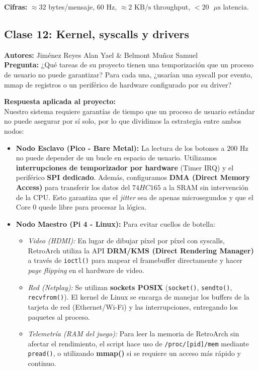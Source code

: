 \documentclass[conference]{IEEEtran}
\begin{document}
\textbf{Cifras:} $\approx 32$ bytes/mensaje, $60\text{ Hz}$, $\approx 2\text{ KB/s}$ throughput, $< 20\text{ }\mu\text{s}$ latencia.

\subsection{Clase 12: Kernel, syscalls y drivers}
\textbf{Autores:} Jiménez Reyes Alan Yael \& Belmont Muñoz Samuel \\
\textbf{Pregunta:} ¿Qué tareas de su proyecto tienen una temporización que un proceso de usuario no puede garantizar? Para cada una, ¿usarían una syscall por evento, mmap de registros o un periférico de hardware configurado por su driver?

\textbf{Respuesta aplicada al proyecto:} \\
Nuestro sistema requiere garantías de tiempo que un proceso de usuario estándar no puede asegurar por sí solo, por lo que dividimos la estrategia entre ambos nodos:

\begin{itemize}
    \item \textbf{Nodo Esclavo (Pico - Bare Metal):} La lectura de los botones a $200\text{ Hz}$ no puede depender de un bucle en espacio de usuario. Utilizamos \textbf{interrupciones de temporizador por hardware} (Timer IRQ) y el periférico \textbf{SPI dedicado}. Además, configuramos \textbf{DMA (Direct Memory Access)} para transferir los datos del $74HC165$ a la SRAM sin intervención de la CPU. Esto garantiza que el \textit{jitter} sea de apenas microsegundos y que el Core 0 quede libre para procesar la lógica.
    \item \textbf{Nodo Maestro (Pi 4 - Linux):} Para evitar cuellos de botella:
    \begin{itemize}
        \item \textit{Video (HDMI):} En lugar de dibujar píxel por píxel con syscalls, RetroArch utiliza la API \textbf{DRM/KMS (Direct Rendering Manager)} a través de \texttt{ioctl()} para mapear el framebuffer directamente y hacer \textit{page flipping} en el hardware de video.
        \item \textit{Red (Netplay):} Se utilizan \textbf{sockets POSIX} (\texttt{socket()}, \texttt{sendto()}, \texttt{recvfrom()}). El kernel de Linux se encarga de manejar los buffers de la tarjeta de red (Ethernet/Wi-Fi) y las interrupciones, entregando los paquetes al proceso.
        \item \textit{Telemetría (RAM del juego):} Para leer la memoria de RetroArch sin afectar el rendimiento, el script hace uso de \texttt{/proc/[pid]/mem} mediante \texttt{pread()}, o utilizando \textbf{mmap()} si se requiere un acceso más rápido y continuo.
    \end{itemize}
\end{itemize}
\end{document}
